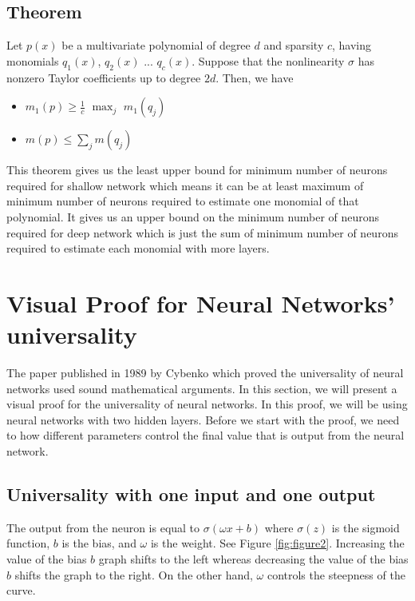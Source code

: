 \documentclass{article}
\begin{document}
\subsection{Theorem}
Let $p(x)$ be a multivariate polynomial of degree $d$ and sparsity $c$, having monomials $q_1(x)$, $q_2(x)$ ... $q_c(x)$. Suppose that the nonlinearity $\sigma$ has nonzero Taylor coefficients up to degree $2d$. Then, we have
    \begin{itemize}
        \item $m_1 (p) \geq \frac{1}{c}$ $\max_j$ $m_1(q_j)$
        \item $m (p) \leq \sum_j m(q_j)$
    \end{itemize}
This theorem gives us the least upper bound for minimum number of neurons required for shallow network which means it can be at least maximum of minimum number of neurons required to estimate one monomial of that polynomial. It gives us an upper bound on the minimum number of neurons required for deep network which is just the sum of minimum number of neurons required to estimate each monomial with more layers.

\section{Visual Proof for Neural Networks' universality}

The paper published in 1989 by Cybenko \cite{paper1989_1} which proved the universality of neural networks used sound mathematical arguments. In this section, we will present a visual proof for the universality of neural networks. In this proof, we will be using neural networks with two hidden layers\cite{website1}. Before we start with the proof, we need to how different parameters control the final value that is output from the neural network.

\subsection{Universality with one input and one output}
The output from the neuron is equal to $\sigma (\omega x + b ) $ where $\sigma(z)$ is the sigmoid function, $b$ is the bias, and $\omega$ is the weight. See Figure \ref{fig:figure2}. Increasing the value of the bias $b$ graph shifts to the left whereas decreasing the value of the bias $b$ shifts the graph to the right. On the other hand, $\omega$ controls the steepness of the curve.
\end{document}
